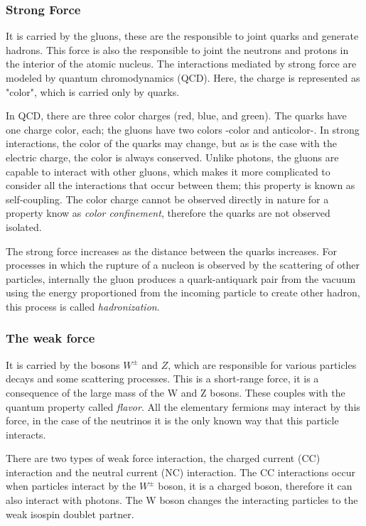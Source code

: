 \subsubsection{Strong Force}
It is carried by the gluons, these are the responsible to joint quarks and generate hadrons. This force is also the responsible to joint the neutrons and protons in the interior of the atomic nucleus. The interactions mediated by strong force are modeled by quantum chromodynamics (QCD). Here, the charge is represented as "color", which is carried only by quarks.

In QCD, there are three color charges (red, blue, and green). The quarks have one charge color, each;  the gluons have two colors -color and anticolor-. In strong interactions, the color of the quarks may change, but as is the case with the electric charge, the color is always conserved. Unlike photons, the gluons are capable to interact with other gluons, which makes it more complicated to consider all the interactions that occur between them; this property is known as self-coupling. The color charge cannot be observed directly in nature for a property know as \textit{color confinement}, therefore the quarks are not observed isolated. 

The strong force increases as the distance between the quarks increases. For processes in which the rupture of a nucleon is observed by the scattering of other particles, internally the gluon produces a quark-antiquark pair from the vacuum using the energy proportioned from the incoming particle to create other hadron, this process is called \textit{hadronization}.

 

\subsubsection{The weak force}
It is carried by the bosons $W^\pm$ and $Z$, which are responsible for various particles decays and some scattering processes. This is a short-range force, it is a consequence of the large mass of the W and Z bosons. These couples with the quantum property called \textit{flavor}. All the elementary fermions may interact by this force, in the case of the neutrinos it is the only known way that this particle interacts.

There are two types of weak force interaction, the charged current (CC) interaction and the neutral current (NC) interaction. The CC interactions occur when particles interact by the $W^\pm$ boson, it is a charged boson, therefore it can also interact with photons. The W boson changes the interacting particles to the weak isospin doublet partner. 

